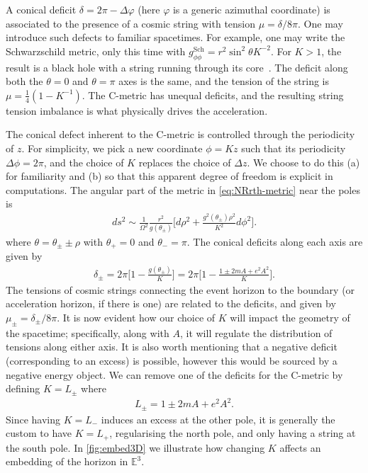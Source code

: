\documentclass[
twoside,
openright,
frontopenright,
]{dmathesis}
\begin{document}
A conical deficit $\delta = 2\pi - \Delta \varphi$ (here $\varphi$ is a generic
azimuthal coordinate) is associated to the presence of a cosmic string with
tension $\mu = \delta/8\pi$. One may introduce such defects to familiar
spacetimes. For example, one may write the Schwarzschild metric, only this time
with $g^{\mathrm{Sch}}_{\phi\phi}= r^2\sin^2\theta K^{-2}$. For $K>1$, the
result is a black hole with a string running through its
core~\cite{Aryal:1986sz}. The deficit along both the $\theta = 0$ and
$\theta= \pi$ axes is the same, and the tension of the string is
$\mu=\frac14(1-K^{-1})$. The C-metric has unequal deficits, and the resulting
string tension imbalance is what physically drives the acceleration.

The conical defect inherent to the C-metric is controlled through the
periodicity of $z$. For simplicity, we pick a new coordinate $\phi = K z$ such
that its periodicity $\Delta\phi=2\pi$, and the choice of $K$ replaces the
choice of $\Delta z$. We choose to do this (a) for familiarity and (b) so that
this apparent degree of freedom is explicit in computations. The angular part of
the metric in \cref{eq:NRrth-metric} near the poles is
\begin{align}
ds^2 \sim \frac{1}{\Omega^2}\frac{r^2}{g(\theta_{\pm})}\bigg[d\rho^2 +
  \frac{g^2(\theta_{\pm}) \rho^{2}}{K^2}d\phi^2\bigg]. 
\end{align}
where $\theta = \theta_{\pm} \pm \rho$ with $\theta_+=0$ and $\theta_-=\pi$. The
conical deficits along each axis are given by 
\begin{align}
  \label{eq:deficitsNR}
  \delta_\pm=2\pi\bigg[1-\frac{g(\theta_\pm)}{K}\bigg] = 2\pi\bigg[1-\frac{1\pm
  2mA + e^2A^2}{K}\bigg]. 
\end{align} 
The tensions of cosmic strings connecting the event horizon to the boundary (or
acceleration horizon, if there is one) are related to the deficits, and given by
$\mu_\pm=\delta_\pm/8\pi$. It is now evident how our choice of $K$ will impact
the geometry of the spacetime; specifically, along with $A$, it will regulate
the distribution of tensions along either axis. It is also worth mentioning that
a negative deficit (corresponding to an excess) is possible, however this would
be sourced by a negative energy object. We can remove one of the deficits for
the C-metric by defining $K=L_\pm$ where
\begin{align}
L_\pm=1\pm 2mA + e^2A^2.
\end{align}
Since having $K=L_-$ induces an excess at the other pole, it is generally the
custom to have $K=L_+$, regularising the north pole, and only having a string at
the south pole. In \cref{fig:embed3D} we illustrate how changing $K$ affects an
embedding of the horizon in $\mathbb{E}^3$. 
\end{document}
